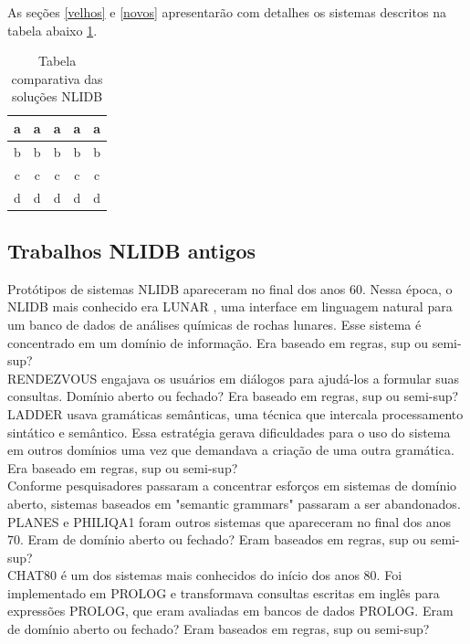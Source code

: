 \documentclass{article}
\begin{document}
As seções \ref{velhos} e \ref{novos} apresentarão com detalhes os sistemas descritos na tabela abaixo \ref{table:exemplos}.

\begin{table}[]
\centering
\begin{tabular}{|c|c|c|c|c|}
\hline
a & a & a & a & a \\ \hline
b & b & b & b & b \\ \hline
c & c & c & c & c \\ \hline
d & d & d & d & d \\ \hline
\end{tabular}
\caption{Tabela comparativa das soluções NLIDB}
\label{table:exemplos}
\end{table}

\subsection{Trabalhos NLIDB antigos\label{velhos}}

Protótipos de sistemas NLIDB apareceram no final dos anos 60. Nessa época, o NLIDB mais conhecido era LUNAR \citep{woods1973progress}, uma interface em linguagem natural para um banco de dados de análises químicas de rochas lunares. Esse sistema é concentrado em um domínio de informação. Era baseado em regras, sup ou semi-sup?\\

RENDEZVOUS \citep{codd1974seven} engajava os usuários em diálogos para ajudá-los a formular suas consultas. Domínio aberto ou fechado? Era baseado em regras, sup ou semi-sup?\\

LADDER \citep{hendrix1978developing} usava gramáticas semânticas, uma técnica que intercala processamento sintático e semântico. Essa estratégia gerava dificuldades para o uso do sistema em outros domínios uma vez que demandava a criação de uma outra gramática. Era baseado em regras, sup ou semi-sup?\\

Conforme pesquisadores passaram a concentrar esforços em sistemas de domínio aberto, sistemas baseados em "semantic grammars" passaram a ser abandonados. PLANES \citep{waltz1978english} e PHILIQA1 \citep{scha1977philips} foram outros sistemas que apareceram no final dos anos 70. Eram de domínio aberto ou fechado? Eram baseados em regras, sup ou semi-sup?\\

CHAT80 \citep{warren1982efficient} é um dos sistemas mais conhecidos do início dos anos 80. Foi implementado em PROLOG e transformava consultas escritas em inglês para expressões PROLOG, que eram avaliadas em bancos de dados PROLOG. Eram de domínio aberto ou fechado? Eram baseados em regras, sup ou semi-sup?\\
\end{document}
